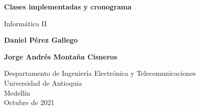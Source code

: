 \documentclass{article}
\begin{document}
\begin{titlepage}
    \begin{center}
        \vspace*{1cm}
            
        \Huge
        \textbf{Clases implementadas y cronograma}
            
        \vspace{0.5cm}
        \LARGE
        Informática II
            
        \vspace{1.7cm}
            
        \textbf{Daniel Pérez Gallego}
        
        \vspace{0.3cm}
        
        \textbf{Jorge Andrés Montaña Cisneros}
            
        \vfill
            
        \vspace{0.8cm}
            
        \Large
        Despartamento de Ingeniería Electrónica y Telecomunicaciones\\
        Universidad de Antioquia\\
        Medellín\\
        Octubre de 2021
            
    \end{center}
\end{titlepage}

\tableofcontents
\end{document}
